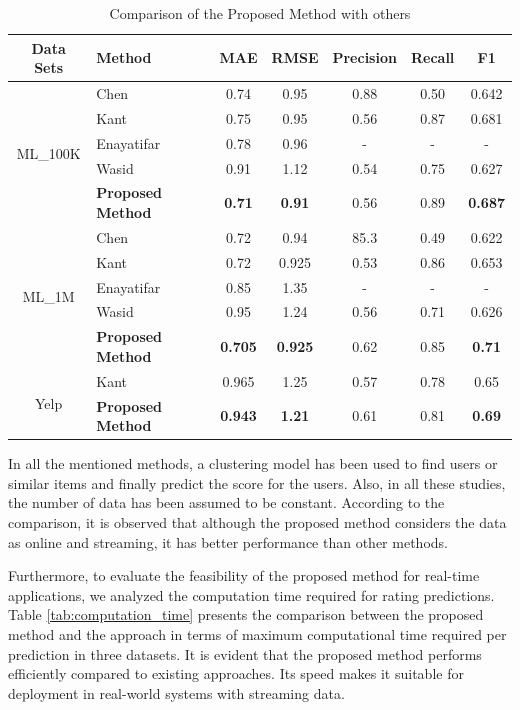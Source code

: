 \documentclass{article}
\theoremstyle{plain}
\theoremstyle{definition}
\theoremstyle{remark}
\begin{document}
\begin{table}[htbp]
\centering
\caption{Comparison of the Proposed Method with others}
\label{tab:comparison_results}
\renewcommand{\arraystretch}{1.3}
\setlength{\tabcolsep}{3pt}
\begin{tabular}{clccccc}
\hline
\textbf{Data Sets} & \textbf{Method} & \textbf{MAE} & \textbf{RMSE} & \textbf{Precision} & \textbf{Recall} & \textbf{F1} \\
\hline
\multirow{5}{*}{ML\_100K} & Chen\cite{liji2018improved} & 0.74 & 0.95 & 0.88 & 0.50 & 0.642 \\
& Kant\cite{kant2017leaderrank} & 0.75 & 0.95 & 0.56 & 0.87 & 0.681 \\
& Enayatifar \cite{mohammadpour2019efficient} & 0.78 & 0.96 & - & - & - \\
& Wasid \cite{wasid2018clustering} & 0.91 & 1.12 & 0.54 & 0.75 & 0.627 \\
& \textbf{Proposed Method} & \textbf{0.71} & \textbf{0.91} & 0.56 & 0.89 & \textbf{0.687} \\
\hline
\multirow{5}{*}{ML\_1M} & Chen & 0.72 & 0.94 & 85.3 & 0.49 & 0.622 \\
& Kant & 0.72 & 0.925 & 0.53 & 0.86 & 0.653 \\
& Enayatifar & 0.85 & 1.35 & - & - & - \\
& Wasid & 0.95 & 1.24 & 0.56 & 0.71 & 0.626 \\
& \textbf{Proposed Method} & \textbf{0.705} & \textbf{0.925} & 0.62 & 0.85 & \textbf{0.71} \\
\hline
\multirow{3}{*}{Yelp} & Kant & 0.965 & 1.25 & 0.57 & 0.78 & 0.65 \\
&  \textbf{Proposed Method} & \textbf{0.943} & \textbf{1.21} & 0.61 & 0.81 & \textbf{0.69} \\
\hline
\end{tabular}
\end{table}

In all the mentioned methods, a clustering model has been used to find users or similar items and finally predict the score for the users. Also, in all these studies, the number of data has been assumed to be constant. According to the comparison, it is observed that although the proposed method considers the data as online and streaming, it has better performance than other methods.

Furthermore, to evaluate the feasibility of the proposed method for real-time applications, we analyzed the computation time required for rating predictions. Table \ref{tab:computation_time} presents the comparison between the proposed method and the approach \cite{kant2017leaderrank} in terms of maximum computational time required per prediction in three datasets. It is evident that the proposed method performs efficiently compared to existing approaches. Its speed makes it suitable for deployment in real-world systems with streaming data.
\end{document}
